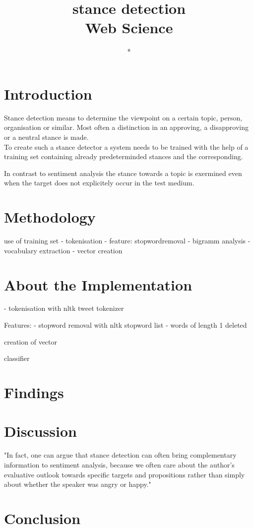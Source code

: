 \documentclass[a4paper,12pt,twoside]{article}
\title{stance detection\\ Web Science }
\author{*}
\begin{document}
\section{Introduction}
Stance detection means to determine the viewpoint on a certain topic, person, organisation or similar. Most often a distinction in an approving, a disapproving or a neutral stance is made.\\ 
To create such a stance detector a system needs to be trained with the help of a training set containing already predeterminded stances and the corresponding. 

In contrast to sentiment analysis the stance towards a topic is exermined even when the target does not explicitely occur in the test medium. 


\section{Methodology}
use of training set
- tokenisation
- feature: stopwordremoval
- bigramm analysis
- vocabulary extraction
- vector creation


\section{About the Implementation}
- tokenisation with nltk tweet tokenizer

Features:
- stopword removal with nltk stopword list
- words of length 1 deleted

creation of vector

classifier

\section{Findings}

\section{Discussion}

"In fact, one can argue that stance detection can often bring complementary information to sentiment analysis, because we often care about the author’s evaluative outlook towards specific targets and propositions rather than simply about whether the speaker was angry or happy."

 

\section{Conclusion}




 
\end{document}
